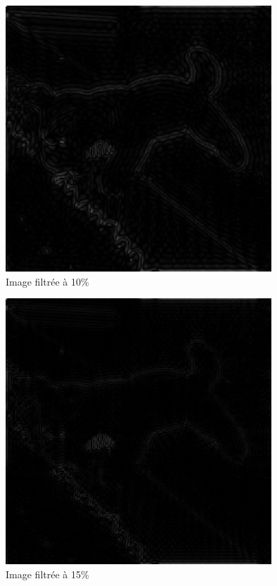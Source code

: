 \documentclass[a4paper]{article}
\begin{document}
\begin{figure}[!ht]
    \center
    \includegraphics[width=10cm]{../images/evert_filtre_10.eps}
    \caption{Image filtrée à 10\%}
\end{figure}

\begin{figure}[!ht]
    \center
    \includegraphics[width=10cm]{../images/evert_filtre_15.eps}
    \caption{Image filtrée à 15\%}
\end{figure}
\end{document}
